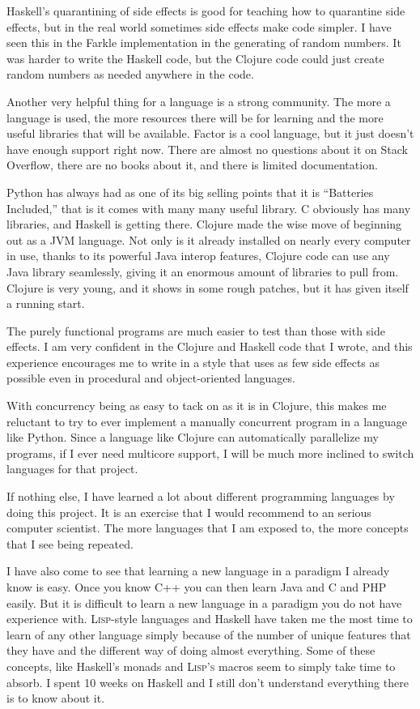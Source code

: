 \documentclass{article}
\begin{document}
Haskell's quarantining of side effects is good for teaching how to quarantine
side effects, but in the real world sometimes side effects make code simpler.  I
have seen this in the Farkle implementation in the generating of random numbers.
It was harder to write the Haskell code, but the Clojure code could just create
random numbers as needed anywhere in the code.

Another very helpful thing for a language is a strong community.  The more a
language is used, the more resources there will be for learning and the more
useful libraries that will be available.  Factor is a cool language, but it just
doesn't have enough support right now.  There are almost no questions about it
on Stack Overflow, there are no books about it, and there is limited
documentation.

Python has always had as one of its big selling points that it is ``Batteries
Included,'' that is it comes with many many useful library.  C obviously has
many libraries, and Haskell is getting there.  Clojure made the wise move of
beginning out as a JVM language.  Not only is it already installed on nearly
every computer in use, thanks to its powerful Java interop features,
Clojure code can use any Java library seamlessly, giving it an enormous amount
of libraries to pull from.  Clojure is very young, and it shows in some rough
patches, but it has given itself a running start.

The purely functional programs are much easier to test than those with side effects.
I am very confident in the Clojure and Haskell code that I wrote, and this experience
encourages me to write in a style that uses as few side effects as possible
even in procedural and object-oriented languages.  

With concurrency being as easy to tack on as it is in Clojure, this makes me
reluctant to try to ever implement a manually concurrent program in a language
like Python.  Since a language like Clojure can automatically parallelize my
programs, if I ever need multicore support, I will be much more inclined to
switch languages for that project.

If nothing else, I have learned a lot about different programming languages by
doing this project.  It is an exercise that I would recommend to an serious
computer scientist.  The more languages that I am exposed to, the more concepts
that I see being repeated.

I have also come to see that learning a new language in a paradigm I already
know is easy.  Once you know C++ you can then learn Java and C and PHP easily.
But it is difficult to learn a new language in a paradigm you do not have
experience with.  \textsc{Lisp}-style languages and Haskell have taken me the
most time to learn of any other language simply because of the number of unique
features that they have and the different way of doing almost everything.  Some
of these concepts, like Haskell's monads and \textsc{Lisp's} macros seem to
simply take time to absorb.  I spent 10 weeks on Haskell and I still don't
understand everything there is to know about it.
\end{document}
